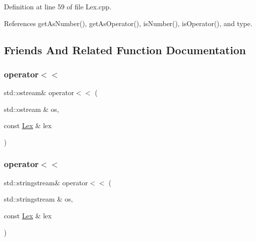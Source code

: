 Definition at line 59 of file Lex.\+cpp.



References get\+As\+Number(), get\+As\+Operator(), is\+Number(), is\+Operator(), and type.



\subsection{Friends And Related Function Documentation}
\mbox{\label{classteam22_1_1_calc_1_1_lex_aca03505bafd6049109d56fd123d2dae6}} 
\subsubsection{\texorpdfstring{operator$<$$<$}{operator<<}\hspace{0.1cm}{\footnotesize\ttfamily [1/2]}}
{\footnotesize\ttfamily std\+::ostream\& operator$<$$<$ (\begin{DoxyParamCaption}\item[{std\+::ostream \&}]{os,  }\item[{const \hyperlink{classteam22_1_1_calc_1_1_lex}{Lex} \&}]{lex }\end{DoxyParamCaption})\hspace{0.3cm}{\ttfamily [friend]}}

\mbox{\label{classteam22_1_1_calc_1_1_lex_a75f9b47ca9b4289a569608f62336b3dd}} 
\subsubsection{\texorpdfstring{operator$<$$<$}{operator<<}\hspace{0.1cm}{\footnotesize\ttfamily [2/2]}}
{\footnotesize\ttfamily std\+::stringstream\& operator$<$$<$ (\begin{DoxyParamCaption}\item[{std\+::stringstream \&}]{os,  }\item[{const \hyperlink{classteam22_1_1_calc_1_1_lex}{Lex} \&}]{lex }\end{DoxyParamCaption})\hspace{0.3cm}{\ttfamily [friend]}}



